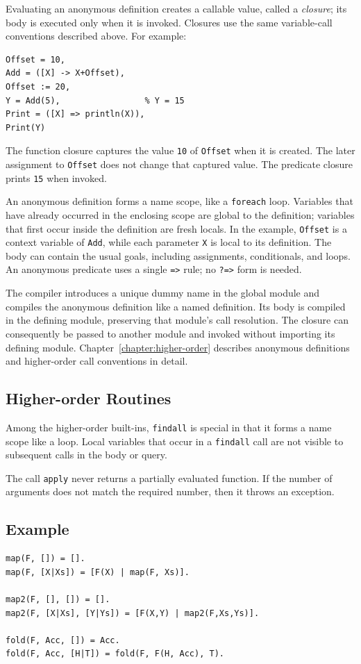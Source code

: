 Evaluating an anonymous definition creates a callable value, called a
\emph{closure}; its body is executed only when it is invoked. Closures use the same variable-call conventions described above. For example:
\begin{verbatim}
Offset = 10,
Add = ([X] -> X+Offset),
Offset := 20,
Y = Add(5),                 % Y = 15
Print = ([X] => println(X)),
Print(Y)
\end{verbatim}
The function closure captures the value \texttt{10} of \texttt{Offset} when
it is created. The later assignment to \texttt{Offset} does not change that
captured value. The predicate closure prints \texttt{15} when invoked.

An anonymous definition forms a name scope, like a \texttt{foreach} loop.
Variables that have already occurred in the enclosing scope are global to
the definition; variables that first occur inside the definition are fresh
locals. In the example, \texttt{Offset} is a context variable of
\texttt{Add}, while each parameter \texttt{X} is local to its definition.
The body can contain the usual goals, including assignments, conditionals,
and loops. An anonymous predicate uses a single \texttt{=>} rule; no
\texttt{?=>} form is needed.

The compiler introduces a unique dummy name in the global module and
compiles the anonymous definition like a named definition. Its body is
compiled in the defining module, preserving that module's call resolution.
The closure can consequently be passed to another module and invoked
without importing its defining module. Chapter~\ref{chapter:higher-order}
describes anonymous definitions and higher-order call conventions in detail.

\subsection{Higher-order Routines}
Among the higher-order built-ins, \texttt{findall} is special in that it forms a name scope like a loop. Local variables that occur in a \texttt{findall} call are not visible to subsequent calls in the body or query.

The call \texttt{apply} never returns a partially evaluated function. If the number of arguments does not match the required number, then it throws an exception.

\subsection*{Example}
\begin{verbatim}
map(F, []) = [].
map(F, [X|Xs]) = [F(X) | map(F, Xs)].

map2(F, [], []) = [].
map2(F, [X|Xs], [Y|Ys]) = [F(X,Y) | map2(F,Xs,Ys)].

fold(F, Acc, []) = Acc.
fold(F, Acc, [H|T]) = fold(F, F(H, Acc), T).
\end{verbatim}

